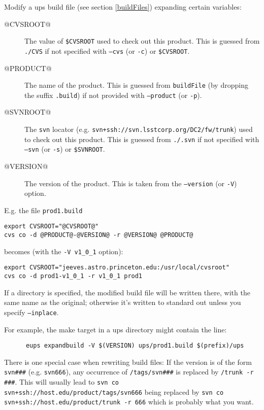 \documentclass{article}
\newcommand{\code}[1]{\texttt{#1}}
\begin{document}
\begin{itemize}
Modify a ups build file (see section \ref{buildFiles}) expanding certain variables:
\begin{description}
  \item[\small @CVSROOT@] The value of \code{\$CVSROOT} used to check out this product.
    This is guessed from \code{./CVS} if not specified with \code{--cvs} (or \code{-c})
    or \code{\$CVSROOT}.
  \item[\small @PRODUCT@] The name of the product. This is guessed from \code{buildFile}
    (by dropping the suffix \code{.build}) if not provided with \code{--product} (or \code{-p}).
  \item[\small @SVNROOT@] The \code{svn} locator (e.g. \code{svn+ssh://svn.lsstcorp.org/DC2/fw/trunk})
    used to check out this product.
    This is guessed from \code{./.svn} if not specified with \code{--svn} (or \code{-s})
    or \code{\$SVNROOT}.
  \item[\small @VERSION@] The version of the product.  This is taken from the \code{--version} (or
    \code{-V}) option.
\end{description}

E.g. the file \code{prod1.build}
\begin{verbatim}
export CVSROOT="@CVSROOT@"
cvs co -d @PRODUCT@-@VERSION@ -r @VERSION@ @PRODUCT@
\end{verbatim}
becomes (with the \code{-V v1\_0\_1} option):
\begin{verbatim}
export CVSROOT="jeeves.astro.princeton.edu:/usr/local/cvsroot"
cvs co -d prod1-v1_0_1 -r v1_0_1 prod1
\end{verbatim}

If a directory is specified, the modified build file will be written
there, with the same name as the original; otherwise it's written to
standard out unless you specify \code{--inplace}.

For example, the make target in a ups directory might contain the line:
\begin{verbatim}
      eups expandbuild -V $(VERSION) ups/prod1.build $(prefix)/ups
\end{verbatim}				%

There is one special case when rewriting build files:  If the version
is of the form \code{svn\#\#\#} (e.g. \code{svn666}), any occurrence of
\code{/tags/svn\#\#\#} is replaced by \code{/trunk -r \#\#\#}. This will usually
lead to \code{svn co svn+ssh://host.edu/product/tags/svn666}
being replaced by \code{svn co svn+ssh://host.edu/product/trunk -r 666}
which is probably what you want.


\end{itemize}
\end{document}
